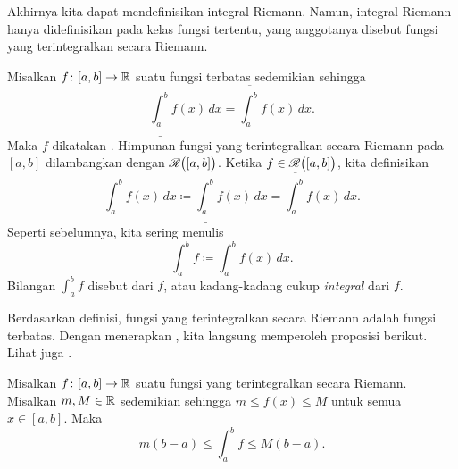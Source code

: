 Akhirnya kita dapat mendefinisikan integral Riemann.  Namun, integral Riemann
hanya didefinisikan pada kelas fungsi tertentu, yang anggotanya disebut
fungsi yang terintegralkan secara Riemann.

\begin{defn}
Misalkan $f \colon [a,b] \to {\mathbb{R}}$ suatu fungsi terbatas sedemikian sehingga
\begin{equation*}
\underline{\int_a^b} f(x)\,dx = \overline{\int_a^b} f(x)\,dx .
\end{equation*}
Maka $f$ dikatakan \emph{}.
Himpunan fungsi yang terintegralkan secara Riemann pada $[a,b]$ dilambangkan
dengan ${\mathscr{R}}\bigl([a,b]\bigr)$.
Ketika $f \in {\mathscr{R}}\bigl([a,b]\bigr)$, kita definisikan
\begin{equation*}
\int_a^b f(x)\,dx \coloneqq 
\underline{\int_a^b} f(x)\,dx = \overline{\int_a^b} f(x)\,dx .
\end{equation*}
Seperti sebelumnya, kita sering menulis
\begin{equation*}
\int_a^b f \coloneqq \int_a^b f(x)\,dx.
\end{equation*}
Bilangan $\int_a^b f$ disebut \emph{}
dari $f$, atau kadang-kadang cukup \emph{integral} dari $f$.
\end{defn}

Berdasarkan definisi, fungsi yang terintegralkan secara Riemann adalah fungsi terbatas.
Dengan menerapkan , kita langsung memperoleh
proposisi berikut.  Lihat juga .

\begin{prop} \label{intbound:prop}
Misalkan $f \colon [a,b] \to {\mathbb{R}}$ suatu fungsi yang terintegralkan secara Riemann.
Misalkan $m, M \in {\mathbb{R}}$ 
sedemikian sehingga $m \leq f(x) \leq M$ untuk semua $x \in [a,b]$.  Maka
\begin{equation*}
m(b-a) \leq
\int_a^b f
\leq M(b-a) .
\end{equation*}
\end{prop}
\begin{myfigureht}
\caption{Luas di bawah kurva dibatasi dari atas oleh
luas seluruh persegi panjang, $M(b-a)$, dan dari bawah oleh
luas bagian yang diarsir, $m(b-a)$.\label{fig:integralminmax}}
\end{myfigureht}

